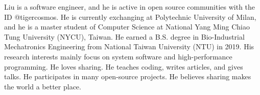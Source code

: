 

\begin{cvparagraph}

Liu is a software engineer, and he is active in open source communities with the ID @tigercosmos.
He is currently exchanging at Polytechnic University of Milan, and he is a master student of Computer Science at
National Yang Ming Chiao Tung University (NYCU), Taiwan.
He earned a B.S. degree in Bio-Industrial Mechatronics Engineering from National Taiwan University (NTU) in 2019.
His research interests mainly focus on system software and high-performance programming.
He loves sharing. He teaches coding, writes articles, and gives talks. He participates in many open-source projects.
He believes sharing makes the world a better place.
\end{cvparagraph}
